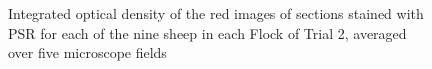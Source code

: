%

\begin{figure}[!h]
\centering
\captionsetup{width=0.6\textwidth}
  \caption{Integrated optical density of the red images of sections stained with PSR for each of the nine sheep in each Flock of Trial 2, averaged over five microscope fields}
\vfill
  \label{fig:redpixt2}
\end{figure}

%

